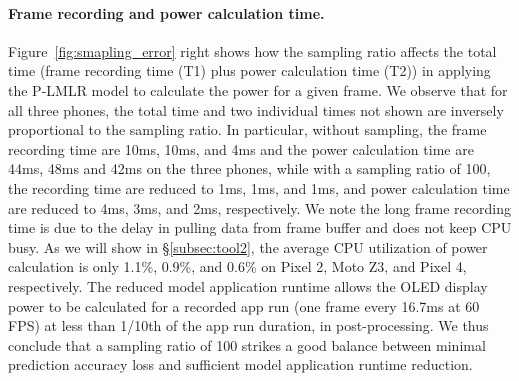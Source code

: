 \paragraph{Frame recording and power calculation time.}
Figure~\ref{fig:smapling_error} right shows how the sampling
ratio affects the total time (frame recording time (T1) 
plus power calculation
time (T2)) in applying the P-LMLR model to
calculate the power for a given frame.
We observe that for all three
phones, the total time and two individual times not shown are inversely proportional to the
sampling ratio. In particular, without sampling, the frame recording
time are 10ms, 10ms, and 4ms
and
the power calculation time are 44ms, 48ms and 42ms on
 the three phones,
while with a sampling ratio of 100, the recording time are reduced to
1ms, 1ms, and 1ms, and power calculation time are reduced to
4ms, 3ms, and 2ms, respectively.
We note the long frame recording time is due to the delay in pulling data from frame buffer
and does not keep CPU busy.
As we will show in \S\ref{subsec:tool2},
the average CPU utilization of power calculation
is only 1.1\%, 0.9\%, and 0.6\% on Pixel 2, Moto Z3, and Pixel 4, respectively.
The reduced model application runtime allows the OLED display power to
be calculated for a recorded app run (one frame every 16.7ms at 60
FPS) at less than 1/10th of the app run duration, in
post-processing.
\fi
We thus conclude that a sampling ratio of 100 strikes
a good balance between minimal prediction accuracy loss and sufficient
model application runtime reduction.


